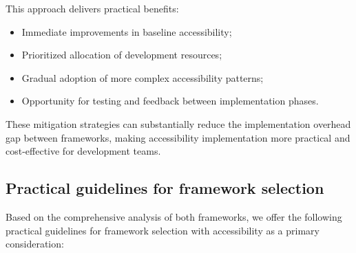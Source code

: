 \begin{enumerate}
    This approach delivers practical benefits:
    \begin{itemize}
        \item Immediate improvements in baseline accessibility;
        \item Prioritized allocation of development resources;
        \item Gradual adoption of more complex accessibility patterns;
        \item Opportunity for testing and feedback between implementation phases.
    \end{itemize}
\end{enumerate}

These mitigation strategies can substantially reduce the implementation overhead gap between frameworks, making accessibility implementation more practical and cost-effective for development teams.

\subsection{Practical guidelines for framework selection}
\label{subsec:framework-selection}

Based on the comprehensive analysis of both frameworks, we offer the following practical guidelines for framework selection with accessibility as a primary consideration:

